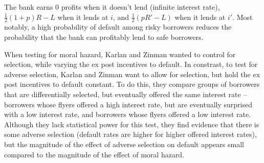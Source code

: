\documentclass[12pt,english]{article}
\begin{document}
The bank earns 0 profits when it doesn't lend (infinite interest rate), $\frac{1}{2}(1 + p)R - L$ when it lends at $i$, and $\frac{1}{2}(pR' - L)$ when it lends at $i'$. Most notably, a high probability of default among risky borrowers reduces the probability that the bank can profitably lend to safe borrowers.

When testing for moral hazard, Karlan and Zinman wanted to control for selection, while varying the ex post incentives to default. In constrast, to test for adverse selection, Karlan and Zinman want to allow for selection, but hold the ex post incentives to default constant. To do this, they compare groups of borrowers that are differentially selected, but eventually offered the same interest rate -- borrowers whose flyers offered a high interest rate, but are eventually surprised with a low interest rate, and borrowers whose flyers offered a low interest rate. Although they lack statistical power for this test, they find evidence that there is some adverse selection (default rates are higher for higher offered interest rates), but the magnitude of the effect of adverse selection on default appears small compared to the magnitude of the effect of moral hazard.
\end{document}
